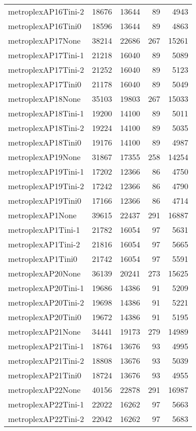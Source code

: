 \begin{longtable}{lrrrr}
metroplexAP16Tini-2 & 18676 & 13644 & 89 & 4943 \\
metroplexAP16Tini0 & 18596 & 13644 & 89 & 4863 \\
metroplexAP17None & 38214 & 22686 & 267 & 15261 \\
metroplexAP17Tini-1 & 21218 & 16040 & 89 & 5089 \\
metroplexAP17Tini-2 & 21252 & 16040 & 89 & 5123 \\
metroplexAP17Tini0 & 21178 & 16040 & 89 & 5049 \\
metroplexAP18None & 35103 & 19803 & 267 & 15033 \\
metroplexAP18Tini-1 & 19200 & 14100 & 89 & 5011 \\
metroplexAP18Tini-2 & 19224 & 14100 & 89 & 5035 \\
metroplexAP18Tini0 & 19176 & 14100 & 89 & 4987 \\
metroplexAP19None & 31867 & 17355 & 258 & 14254 \\
metroplexAP19Tini-1 & 17202 & 12366 & 86 & 4750 \\
metroplexAP19Tini-2 & 17242 & 12366 & 86 & 4790 \\
metroplexAP19Tini0 & 17166 & 12366 & 86 & 4714 \\
metroplexAP1None & 39615 & 22437 & 291 & 16887 \\
metroplexAP1Tini-1 & 21782 & 16054 & 97 & 5631 \\
metroplexAP1Tini-2 & 21816 & 16054 & 97 & 5665 \\
metroplexAP1Tini0 & 21742 & 16054 & 97 & 5591 \\
metroplexAP20None & 36139 & 20241 & 273 & 15625 \\
metroplexAP20Tini-1 & 19686 & 14386 & 91 & 5209 \\
metroplexAP20Tini-2 & 19698 & 14386 & 91 & 5221 \\
metroplexAP20Tini0 & 19672 & 14386 & 91 & 5195 \\
metroplexAP21None & 34441 & 19173 & 279 & 14989 \\
metroplexAP21Tini-1 & 18764 & 13676 & 93 & 4995 \\
metroplexAP21Tini-2 & 18808 & 13676 & 93 & 5039 \\
metroplexAP21Tini0 & 18724 & 13676 & 93 & 4955 \\
metroplexAP22None & 40156 & 22878 & 291 & 16987 \\
metroplexAP22Tini-1 & 22022 & 16262 & 97 & 5663 \\
metroplexAP22Tini-2 & 22042 & 16262 & 97 & 5683 \\

\end{longtable}
